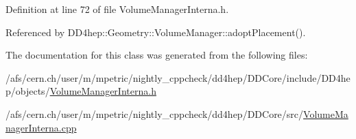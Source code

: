 Definition at line 72 of file Volume\+Manager\+Interna.\+h.



Referenced by D\+D4hep\+::\+Geometry\+::\+Volume\+Manager\+::adopt\+Placement().



The documentation for this class was generated from the following files\+:\begin{DoxyCompactItemize}
\item 
/afs/cern.\+ch/user/m/mpetric/nightly\+\_\+cppcheck/dd4hep/\+D\+D\+Core/include/\+D\+D4hep/objects/\hyperlink{_volume_manager_interna_8h}{Volume\+Manager\+Interna.\+h}\item 
/afs/cern.\+ch/user/m/mpetric/nightly\+\_\+cppcheck/dd4hep/\+D\+D\+Core/src/\hyperlink{_volume_manager_interna_8cpp}{Volume\+Manager\+Interna.\+cpp}\end{DoxyCompactItemize}
